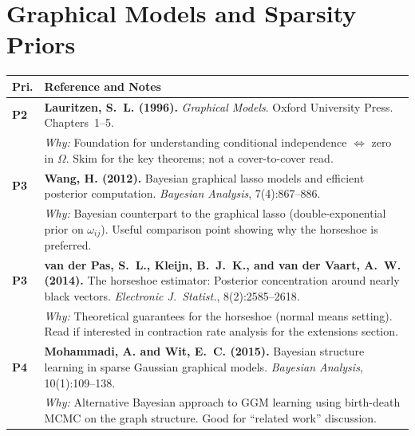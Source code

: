 \documentclass[11pt,a4paper]{article}
\begin{document}
\section{Graphical Models and Sparsity Priors}

\begin{longtable}{@{}p{}p{}@{}}
\toprule
\textbf{Pri.} & \textbf{Reference and Notes} \\
\midrule
\endhead

\textcolor{P2}{\textbf{P2}} &
\textbf{Lauritzen, S.~L. (1996).} \textit{Graphical Models}. Oxford University Press. Chapters~1--5. \\
& \textit{Why:} Foundation for understanding conditional independence $\Leftrightarrow$ zero in $\Omega$. Skim for the key theorems; not a cover-to-cover read. \\[0.8em]

\textcolor{P3}{\textbf{P3}} &
\textbf{Wang, H. (2012).} Bayesian graphical lasso models and efficient posterior computation. \textit{Bayesian Analysis}, 7(4):867--886. \\
& \textit{Why:} Bayesian counterpart to the graphical lasso (double-exponential prior on $\omega_{ij}$). Useful comparison point showing why the horseshoe is preferred. \\[0.8em]

\textcolor{P3}{\textbf{P3}} &
\textbf{van der Pas, S.~L., Kleijn, B.~J.~K., and van der Vaart, A.~W. (2014).} The horseshoe estimator: Posterior concentration around nearly black vectors. \textit{Electronic J.\ Statist.}, 8(2):2585--2618. \\
& \textit{Why:} Theoretical guarantees for the horseshoe (normal means setting). Read if interested in contraction rate analysis for the extensions section. \\[0.8em]

\textcolor{P4}{\textbf{P4}} &
\textbf{Mohammadi, A. and Wit, E.~C. (2015).} Bayesian structure learning in sparse Gaussian graphical models. \textit{Bayesian Analysis}, 10(1):109--138. \\
& \textit{Why:} Alternative Bayesian approach to GGM learning using birth-death MCMC on the graph structure. Good for ``related work'' discussion. \\

\bottomrule
\end{longtable}
\end{document}
